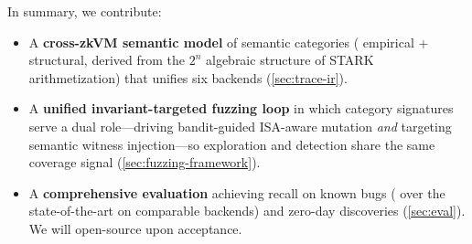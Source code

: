 In summary, we contribute:
\begin{itemize}
    \item A \textbf{cross-zkVM semantic model} of  semantic categories ( empirical +  structural, derived from the $2^n$ algebraic structure of STARK arithmetization) that unifies six backends (\autoref{sec:trace-ir}).
    \item A \textbf{unified invariant-targeted fuzzing loop} in which category signatures serve a dual role---driving bandit-guided ISA-aware mutation \emph{and} targeting semantic witness injection---so exploration and detection share the same coverage signal (\autoref{sec:fuzzing-framework}).
    \item A \textbf{comprehensive evaluation} achieving  recall on  known bugs (\tbd{$1.5\times$} over the state-of-the-art on comparable backends) and  zero-day discoveries (\autoref{sec:eval}). We will open-source \tool upon acceptance.
\end{itemize}
